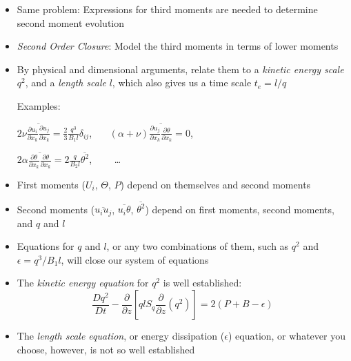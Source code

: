\documentclass[landscape]{seminar}
\newcommand{\pdiff}[2]{\frac{\partial #1}{\partial #2}}
\begin{document}
\begin{slide}

\begin{itemize}

  \item Same problem: Expressions for third moments are needed to determine second moment evolution

  \item \emph{Second Order Closure}: Model the third moments in terms of lower moments

  \item By physical and dimensional arguments, relate them to a \emph{kinetic energy scale} $q^2$, and a \emph{length scale} $l$, which also gives us a time scale $t_e = l / q$

\begin{center}
Examples:
\end{center}

$2 \nu \overline{\pdiff{u_i}{x_k} \pdiff{u_j}{x_k}} = \frac{2}{3} \frac{q^3}{B_1 l} \delta_{ij}$, \ \ \ $(\alpha + \nu) \overline{\pdiff{u_j}{x_k} \pdiff{\theta}{x_k} } = 0$,

\bigskip

$2 \alpha \overline{\pdiff{\theta}{x_k} \pdiff{\theta}{x_k} } = 2 \frac{q}{B_2 l} \overline{\theta^2}$, \ \ \ \ \ldots

\end{itemize}

\end{slide}
\begin{slide}

\begin{itemize}

  \item First moments ($U_i$, $\Theta$, $P$) depend on themselves and second moments

  \item Second moments ($\overline{u_i u_j}$, $\overline{u_i \theta}$, $\overline{\theta^2}$) depend on first moments, second moments, and $q$ and $l$

  \item Equations for $q$ and $l$, or any two combinations of them, such as $q^2$ and $\epsilon = q^3/B_1 l$, will close our system of equations

  \item The \emph{kinetic energy equation} for $q^2$ is well established:
\[
\frac{D q^2}{Dt} - \pdiff{}{z} \left[q l S_q \pdiff{}{z}\left(q^2\right)\right] = 2(P + B - \epsilon)
\]

  \item The \emph{length scale equation}, or energy dissipation ($\epsilon$) equation, or whatever you choose, however, is not so well established

\end{itemize}

\end{slide}
\end{document}
